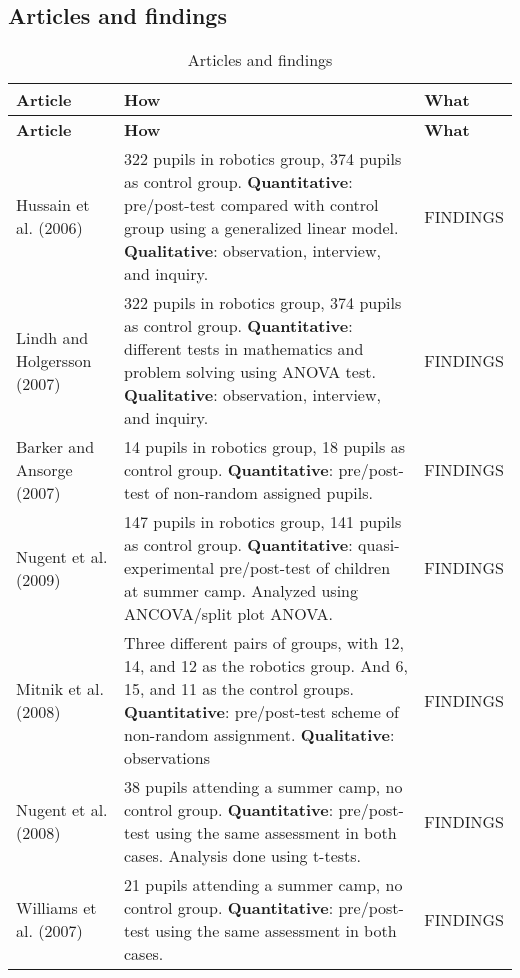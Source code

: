 \subsection*{Articles and findings}
\setlength\LTleft{0px}
\setlength\LTright{0px}
\begin{longtable}{@{\extracolsep{\fill}}p{}p{}p{}}
	\hline \multicolumn{1}{l}{\textbf{Article}} & \multicolumn{1}{l}{\textbf{How}} & \multicolumn{1}{l}{\textbf{What}} \\ \hline\hline
	\endfirsthead
	\hline \multicolumn{1}{l}{\textbf{Article}} & \multicolumn{1}{l}{\textbf{How}} & \multicolumn{1}{l}{\textbf{What}} \\ \hline\hline
	\endhead
	\hline \caption{Articles and findings}\endlastfoot
	Hussain et al. (2006) & 322 pupils in robotics group, 374 pupils as control group. \textbf{Quantitative}: pre/post-test compared with control group using a generalized linear model. \textbf{Qualitative}: observation, interview, and inquiry. & FINDINGS \\\hline
	Lindh and Holgersson (2007) & 322 pupils in robotics group, 374 pupils as control group. \textbf{Quantitative}: different tests in mathematics and problem solving using ANOVA test. \textbf{Qualitative}: observation, interview, and inquiry. &  FINDINGS \\\hline
	Barker and Ansorge (2007) & 14 pupils in robotics group, 18 pupils as control group. \textbf{Quantitative}: pre/post-test of non-random assigned pupils. & FINDINGS \\\hline
	Nugent et al. (2009) & 147 pupils in robotics group, 141 pupils as control group. \textbf{Quantitative}: quasi-experimental pre/post-test of children at summer camp. Analyzed using ANCOVA/split plot ANOVA. & FINDINGS \\\hline
	Mitnik et al. (2008) & Three different pairs of groups, with 12, 14, and 12 as the robotics group. And 6, 15, and 11 as the control groups. \textbf{Quantitative}: pre/post-test scheme of non-random assignment. \textbf{Qualitative}: observations  & FINDINGS \\\hline
	Nugent et al. (2008) & 38 pupils attending a summer camp, no control group. \textbf{Quantitative}: pre/post-test using the same assessment in both cases. Analysis done using t-tests. & FINDINGS \\\hline
	Williams et al. (2007) & 21 pupils attending a summer camp, no control group. \textbf{Quantitative}: pre/post-test using the same assessment in both cases.  & FINDINGS \\\hline
\end{longtable}
